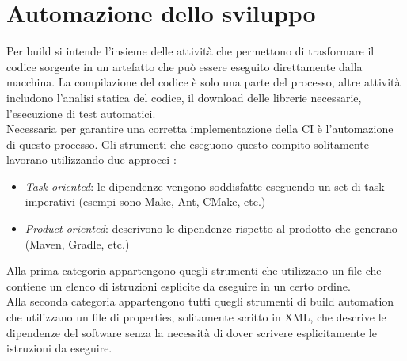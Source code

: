 \documentclass[a4paper, 12pt]{report}
\numberwithin{equation}{section}
\begin{document}
\section{Automazione dello sviluppo}
Per build si intende l’insieme delle attività che permettono di trasformare il codice sorgente in un artefatto che può essere eseguito direttamente dalla macchina. La compilazione del codice è solo una parte del processo, altre attività includono l’analisi statica del codice, il download delle librerie necessarie, l’esecuzione di test automatici.\\
Necessaria per garantire una corretta implementazione della CI è l’automazione di questo processo. Gli strumenti che eseguono questo compito solitamente lavorano utilizzando due approcci \cite{clark-automation}:
\begin{itemize}
    \item \emph{Task-oriented}: le dipendenze vengono soddisfatte eseguendo un set di task imperativi (esempi sono Make, Ant, CMake, etc.)
    \item \emph{Product-oriented}: descrivono le dipendenze rispetto al prodotto che generano (Maven, Gradle, etc.)
\end{itemize}
Alla prima categoria appartengono quegli strumenti che utilizzano un file che contiene un elenco di istruzioni esplicite da eseguire in un certo ordine.\\
Alla seconda categoria appartengono tutti quegli strumenti di build automation che utilizzano un file di properties, solitamente scritto in XML, che descrive le dipendenze del software senza la necessità di dover scrivere esplicitamente le istruzioni da eseguire.
\end{document}
